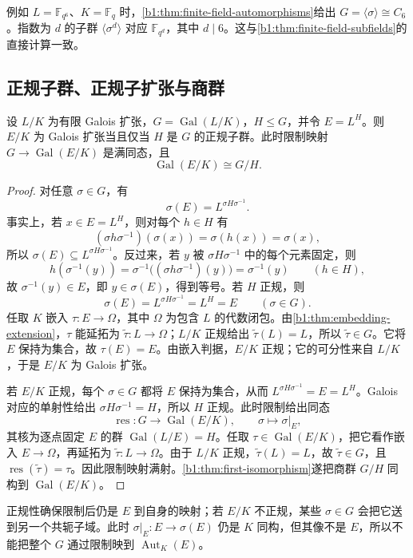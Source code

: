 \ProseParagraphBreak
例如 \(L=\mathbb F_{q^6}\)、\(K=\mathbb F_q\) 时，\cref{b1:thm:finite-field-automorphisms}给出 \(G=\langle\sigma\rangle\cong C_6\)。指数为 \(d\) 的子群 \(\langle\sigma^d\rangle\) 对应 \(\mathbb F_{q^d}\)，其中 \(d\mid6\)。这与\cref{b1:thm:finite-field-subfields}的直接计算一致。

\subsection{正规子群、正规子扩张与商群}
\label{b1:subsec:1902:03}

\begin{theorem}\label{b1:thm:galois-quotient}
	设 \(L/K\) 为有限 Galois 扩张，\(G=\operatorname{Gal}(L/K)\)，\(H\leq G\)，并令 \(E=L^H\)。则 \(E/K\) 为 Galois 扩张当且仅当 \(H\) 是 \(G\) 的正规子群。此时限制映射 \(G\rightarrow\operatorname{Gal}(E/K)\) 是满同态，且
	\[
		\operatorname{Gal}(E/K)\cong G/H.
	\]
\end{theorem}
\begin{proof}
	对任意 \(\sigma\in G\)，有
	\[
		\sigma(E)=L^{\sigma H\sigma^{-1}}.
	\]
	事实上，若 \(x\in E=L^H\)，则对每个 \(h\in H\) 有
	\[
		(\sigma h\sigma^{-1})(\sigma(x))=\sigma(h(x))=\sigma(x),
	\]
	所以 \(\sigma(E)\subseteq L^{\sigma H\sigma^{-1}}\)。反过来，若 \(y\) 被 \(\sigma H\sigma^{-1}\) 中的每个元素固定，则
	\[
		h(\sigma^{-1}(y))=\sigma^{-1}\bigl((\sigma h\sigma^{-1})(y)\bigr) =\sigma^{-1}(y)\qquad(h\in H),
	\]
	故 \(\sigma^{-1}(y)\in E\)，即 \(y\in\sigma(E)\)，得到等号。若 \(H\) 正规，则
	\[
		\sigma(E)=L^{\sigma H\sigma^{-1}}=L^H=E\qquad(\sigma\in G).
	\]
	任取 \(K\) 嵌入 \(\tau:E\rightarrow\Omega\)，其中 \(\Omega\) 为包含 \(L\) 的代数闭包。由\cref{b1:thm:embedding-extension}，\(\tau\) 能延拓为 \(\widetilde\tau:L\rightarrow\Omega\)；\(L/K\) 正规给出 \(\widetilde\tau(L)=L\)，所以 \(\widetilde\tau\in G\)。它将 \(E\) 保持为集合，故 \(\tau(E)=E\)。由嵌入判据，\(E/K\) 正规；它的可分性来自 \(L/K\)，于是 \(E/K\) 为 Galois 扩张。

	若 \(E/K\) 正规，每个 \(\sigma\in G\) 都将 \(E\) 保持为集合，从而 \(L^{\sigma H\sigma^{-1}}=E=L^H\)。Galois 对应的单射性给出 \(\sigma H\sigma^{-1}=H\)，所以 \(H\) 正规。此时限制给出同态
	\[
		\operatorname{res}:G\longrightarrow\operatorname{Gal}(E/K),\qquad \sigma\longmapsto\sigma|_E,
	\]
	其核为逐点固定 \(E\) 的群 \(\operatorname{Gal}(L/E)=H\)。任取 \(\tau\in\operatorname{Gal}(E/K)\)，把它看作嵌入 \(E\rightarrow\Omega\)，再延拓为 \(\widetilde\tau:L\rightarrow\Omega\)。由于 \(L/K\) 正规，\(\widetilde\tau(L)=L\)，故 \(\widetilde\tau\in G\)，且 \(\operatorname{res}(\widetilde\tau)=\tau\)。因此限制映射满射。\cref{b1:thm:first-isomorphism}遂把商群 \(G/H\) 同构到 \(\operatorname{Gal}(E/K)\)。
\end{proof}
正规性确保限制后仍是 \(E\) 到自身的映射；若 \(E/K\) 不正规，某些 \(\sigma\in G\) 会把它送到另一个共轭子域。此时 \(\sigma|_E:E\rightarrow\sigma(E)\) 仍是 \(K\) 同构，但其像不是 \(E\)，所以不能把整个 \(G\) 通过限制映到 \(\operatorname{Aut}_K(E)\)。

